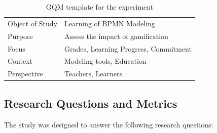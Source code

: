 \begin{table}[ht]
\centering
\caption{GQM template for the experiment}
\label{tab:gqm5}
\footnotesize
\begin{tabular}{@{}p{} p{}@{}}
\toprule
Object of Study & Learning of BPMN Modeling \\
Purpose & Assess the impact of gamification \\
Focus & Grades, Learning Progress, Commitment  \\
Context & Modeling tools, Education \\
Perspective & Teachers, Learners\\
\bottomrule
\end{tabular}
\end{table}

\subsection{Research Questions and Metrics}

The study was designed to answer the following research questions:

